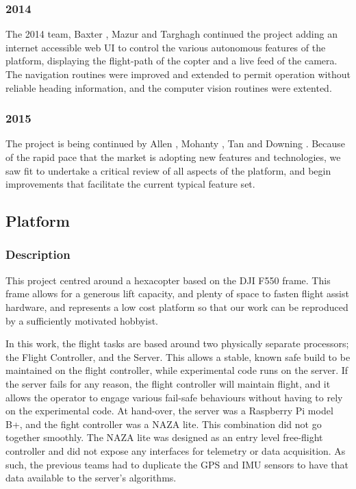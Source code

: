 \documentclass[a4paper, 11pt, titlepage]{article}
\begin{document}
    \subsubsection{2014}

      The 2014 team, Baxter \cite{Baxter}, Mazur \cite{Mazur} and Targhagh \cite{Targhagh} continued the project adding an internet accessible web UI to control the various autonomous features of the platform, displaying the flight-path of the copter and a live feed of the camera.
      The navigation routines were improved and extended to permit operation without reliable heading information, and the computer vision routines were extented.

    \subsubsection{2015}
      The project is being continued by Allen \cite{Allen}, Mohanty \cite{Mohanty}, Tan \cite{Tan} and Downing \cite{Downing}.
      Because of the rapid pace that the market is adopting new features and technologies, we saw fit to undertake a critical review of all aspects of the platform, and begin improvements that facilitate the current typical feature set.


  \subsection{Platform}
    \subsubsection{Description}
      This project centred around a hexacopter based on the DJI F550 frame. This frame allows for a generous lift capacity, and plenty of space to fasten flight assist hardware, and represents a low cost platform so that our work can be reproduced by a sufficiently motivated hobbyist.
      
      In this work, the flight tasks are based around two physically separate processors; the Flight Controller, and the Server. This allows a stable, known safe build to be maintained on the flight controller, while experimental code runs on the server. If the server fails for any reason, the flight controller will maintain flight, and it allows the operator to engage various fail-safe behaviours without having to rely on the experimental code.
      At hand-over, the server was a Raspberry Pi model B+, and the fight controller was a NAZA lite.
      This combination did not go together smoothly. The NAZA lite was designed as an entry level free-flight controller and did not expose any interfaces for telemetry or data acquisition.  As such, the previous teams had to duplicate the GPS and IMU sensors to have that data available to the server's algorithms. 
\end{document}
